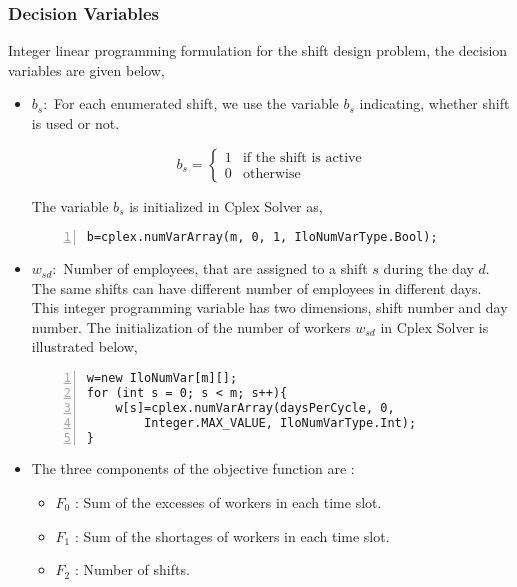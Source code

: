 \subsubsection{Decision Variables}

Integer linear programming formulation for the shift design problem, the decision variables are given below,
\begin{itemize}
\item $b_s : $ For each enumerated shift, we use the variable $b_s$ indicating, whether shift is used or not. 

\begin{equation}
b_s  = \left\{ \begin{array}{cc}
		1 & \mbox{if the shift is active} \\
		0 & \mbox{otherwise}
	    \end{array}
    \right.
\end{equation}

 The variable $b_s$ is initialized in Cplex Solver as,

\begin{lstlisting}[frame=single, numbers=left]
b=cplex.numVarArray(m, 0, 1, IloNumVarType.Bool);
\end{lstlisting}

\item $w_{sd} : $ Number of employees, that are assigned to a shift $s$ during the day $d$. The same shifts can have different number of employees in different days. This integer programming variable has two dimensions, shift number and day number. The initialization of the number of workers $w_{sd}$ in Cplex Solver is illustrated below,

\begin{lstlisting}[frame=single, numbers=left]
w=new IloNumVar[m][]; 
for (int s = 0; s < m; s++){ 
	w[s]=cplex.numVarArray(daysPerCycle, 0, 
		Integer.MAX_VALUE, IloNumVarType.Int);				
}	
\end{lstlisting}

\item The three components of the objective function are :

\begin{itemize}
\item[] $F_0$ : Sum of the excesses of workers in each time slot. 

\item[] $F_1$ : Sum of the shortages of workers in each time slot.

\item[] $F_2$ : Number of shifts.
 \end{itemize}


\end{itemize}
